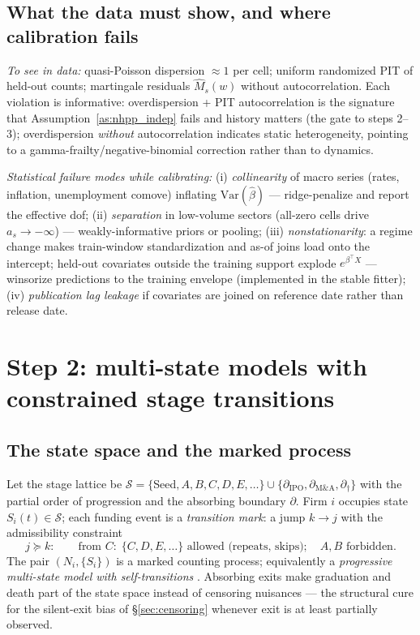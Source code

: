 \documentclass[11pt]{article}
\numberwithin{assumption}{section}
\numberwithin{proposition}{section}
\numberwithin{remark}{section}
\begin{document}
\subsection{What the data must show, and where calibration fails}
\emph{To see in data:} quasi-Poisson dispersion $\approx 1$ per cell;
uniform randomized PIT of held-out counts; martingale residuals
$\widehat M_s(w)$ without autocorrelation. Each violation is informative:
overdispersion + PIT autocorrelation is the signature that
Assumption~\ref{as:nhpp_indep} fails and history matters (the gate to
steps 2--3); overdispersion \emph{without} autocorrelation indicates static
heterogeneity, pointing to a gamma-frailty/negative-binomial correction
\citep{vaupel1979} rather than to dynamics.

\emph{Statistical failure modes while calibrating:}
(i) \emph{collinearity} of macro series (rates, inflation, unemployment
comove) inflating $\mathrm{Var}(\hat\beta)$ --- ridge-penalize and report
the effective dof;
(ii) \emph{separation} in low-volume sectors (all-zero cells drive
$a_s\to-\infty$) --- weakly-informative priors or pooling;
(iii) \emph{nonstationarity}: a regime change makes train-window
standardization and as-of joins load onto the intercept; held-out
covariates outside the training support explode $e^{\beta^\top X}$ ---
winsorize predictions to the training envelope (implemented in the stable
fitter);
(iv) \emph{publication lag leakage} if covariates are joined on reference
date rather than release date.

\section{Step 2: multi-state models with constrained stage transitions}
\label{sec:step2}

\subsection{The state space and the marked process}
Let the stage lattice be $\mathcal S=\{$Seed$,A,B,C,D,E,\dots\}
\cup\{\partial_{\mathrm{IPO}},\partial_{\mathrm{M\&A}},
\partial_{\dagger}\}$ with the partial order of progression and the
absorbing boundary $\partial$. Firm $i$ occupies state $S_i(t)\in\mathcal S$;
each funding event is a \emph{transition mark}: a jump $k\to j$ with the
admissibility constraint
\begin{equation}
j \succeq k:\qquad
\text{from } C:\; \{C, D, E,\dots\} \text{ allowed (repeats, skips)};\quad
A, B \text{ forbidden}.
\label{eq:admissible}
\end{equation}
The pair $(N_i,\{S_i\})$ is a marked counting process; equivalently a
\emph{progressive multi-state model with self-transitions}
\citep{putter2007,abgk1993}. Absorbing exits make graduation and death part
of the state space instead of censoring nuisances --- the structural cure
for the silent-exit bias of \S\ref{sec:censoring} whenever exit is at least
partially observed.
\end{document}
